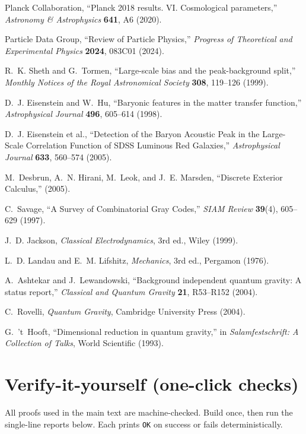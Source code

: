 \documentclass[12pt,a4paper]{article}
\begin{document}
\begin{thebibliography}{99}
Planck Collaboration,
``Planck 2018 results. VI. Cosmological parameters,''
\emph{Astronomy \& Astrophysics} \textbf{641}, A6 (2020).

Particle Data Group,
``Review of Particle Physics,''
\emph{Progress of Theoretical and Experimental Physics} \textbf{2024}, 083C01 (2024).

R.~K. Sheth and G.~Tormen,
``Large-scale bias and the peak-background split,''
\emph{Monthly Notices of the Royal Astronomical Society} \textbf{308}, 119--126 (1999).

D.~J. Eisenstein and W.~Hu,
``Baryonic features in the matter transfer function,''
\emph{Astrophysical Journal} \textbf{496}, 605--614 (1998).

D.~J. Eisenstein et al.,
``Detection of the Baryon Acoustic Peak in the Large-Scale Correlation Function of SDSS Luminous Red Galaxies,''
\emph{Astrophysical Journal} \textbf{633}, 560--574 (2005).

M.~Desbrun, A.~N. Hirani, M.~Leok, and J.~E. Marsden,
``Discrete Exterior Calculus,'' (2005).

C.~Savage,
``A Survey of Combinatorial Gray Codes,''
\emph{SIAM Review} \textbf{39}(4), 605--629 (1997).

J.~D. Jackson,
\emph{Classical Electrodynamics}, 3rd ed.,
Wiley (1999).

L.~D. Landau and E.~M. Lifshitz,
\emph{Mechanics}, 3rd ed.,
Pergamon (1976).

A.~Ashtekar and J.~Lewandowski,
``Background independent quantum gravity: A status report,''
\emph{Classical and Quantum Gravity} \textbf{21}, R53--R152 (2004).

C.~Rovelli,
\emph{Quantum Gravity},
Cambridge University Press (2004).

G.~'t~Hooft,
``Dimensional reduction in quantum gravity,''
in \emph{Salamfestschrift: A Collection of Talks}, World Scientific (1993).

\end{thebibliography}

\appendix

\section{Verify-it-yourself (one-click checks)}
\label{app:verify}
All proofs used in the main text are machine-checked. Build once, then run the single-line reports below. Each prints \texttt{OK} on success or fails deterministically.
\end{document}
